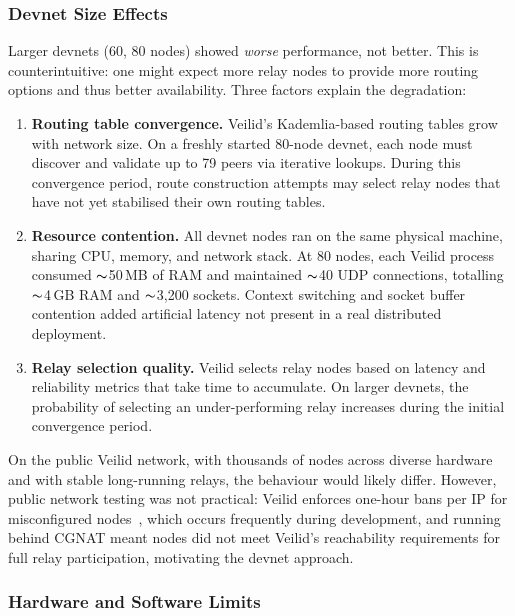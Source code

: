 \subsubsection{Devnet Size Effects}

Larger devnets (60, 80 nodes) showed \emph{worse} performance, not better.
This is counterintuitive: one might expect more relay nodes to provide more
routing options and thus better availability.  Three factors explain the
degradation:

\begin{enumerate}[noitemsep]
  \item \textbf{Routing table convergence.}  Veilid's Kademlia-based routing
    tables grow with network size.  On a freshly started 80-node devnet, each
    node must discover and validate up to 79 peers via iterative lookups.
    During this convergence period, route construction attempts may select
    relay nodes that have not yet stabilised their own routing tables.
  \item \textbf{Resource contention.}  All devnet nodes ran on the same
    physical machine, sharing CPU, memory, and network stack.  At 80 nodes,
    each Veilid process consumed ${\thicksim}$50\,MB of RAM and maintained
    ${\thicksim}$40 UDP connections, totalling ${\thicksim}$4\,GB RAM and
    ${\thicksim}$3,200 sockets.  Context switching and socket buffer contention
    added artificial latency not present in a real distributed deployment.
  \item \textbf{Relay selection quality.}  Veilid selects relay nodes based
    on latency and reliability metrics that take time to accumulate.  On
    larger devnets, the probability of selecting an under-performing relay
    increases during the initial convergence period.
\end{enumerate}

On the public Veilid network, with thousands of nodes across diverse hardware
and with stable long-running relays, the behaviour would likely differ.
However, public network testing was not practical: Veilid enforces
one-hour bans per IP for misconfigured nodes~\cite{rioux2026_ip_punishment},
which occurs frequently during development, and running behind CGNAT meant
nodes did not meet Veilid's reachability requirements for full relay
participation, motivating the devnet approach.

\subsubsection{Hardware and Software Limits}

